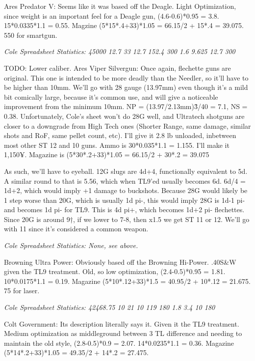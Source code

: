 \begin{multicols*}{2}
	Ares Predator V: Seems like it was based off the Deagle. Light Optimization, since weight is an important feel for a Deagle gun, (4.6-0.6)*0.95 = 3.8. 15*0.0335*1.1 = 0.55. Magzine (5*15*.4+33)*1.05 = 66.15/2 + 15*.4 = 39.075. 550 for smartgun.
	
	\textit{\textcolor{OliveGreen}{Cole Spreadsheet Statistics: 45000 12.7 33 12.7 152.4 300 1.6 9.625 12.7 300}}
	
	
	TODO: Lower caliber.
	Ares Viper Silvergun: Once again, flechette guns are original. This one is intended to be more deadly than the Needler, so it'll have to be higher than 10mm. We'll go with 28 gauge (13.97mm) even though it's a mild bit comically large, because it's common use, and will give a noticeable improvement from the minimum 10mm. NP = (13.97/2.13mm)\^3/40 = 7.1, NS = 0.38. Unfortunately, Cole's sheet won't do 28G well, and Ultratech shotguns are closer to a downgrade from High Tech ones (Shorter Range, same damage, similar shots and RoF, same pellet count, etc). I'll give it 2.8 lb unloaded, inbetween most other ST 12 and 10 guns. Ammo is 30*0.035*1.1 = 1.155. I'll make it 1,150¥. Magazine is (5*30*.2+33)*1.05 = 66.15/2 + 30*.2 = 39.075
	
	As such, we'll have to eyeball. 12G slugs are 4d+4, functionally equivalent to 5d. A similar round to that is 5.56, which when TL9'ed usually becomes 6d. 6d/4 = 1d+2, which would imply +1 damage to buckshots. Because 28G would likely be 1 step worse than 20G, which is usually 1d pi-, this would imply 28G is 1d-1 pi- and becomes 1d pi- for TL9. This is 4d pi+, which becomes 1d+2 pi- flechettes. Since 20G is around 9†, if we lower to 7-8, then x1.5 we get ST 11 or 12. We'll go with 11 since it's considered a common weapon.
	
	\textit{\textcolor{OliveGreen}{Cole Spreadsheet Statistics: None, see above.}}
	
	Browning Ultra Power: Obviously based off the Browning Hi-Power. .40S\&W given the TL9 treatment. Old, so low optimization, (2.4-0.5)*0.95 = 1.81. 10*0.0175*1.1 = 0.19. Magazine (5*10*.12+33)*1.5 = 40.95/2 + 10*.12 = 21.675. 75 for laser.
	
	\textit{\textcolor{OliveGreen}{Cole Spreadsheet Statistics: 42468.75 10 21 10 119 180 1.8 3.4 10 180}}
	
	Colt Government: Its description literally says it. Given it the TL9 treatment. Medium optimization as middleground between 3 TL difference and needing to maintain the old style, (2.8-0.5)*0.9 = 2.07. 14*0.0235*1.1 = 0.36. Magazine (5*14*.2+33)*1.05 = 49.35/2 + 14*.2 = 27.475.
	

\end{multicols*}
